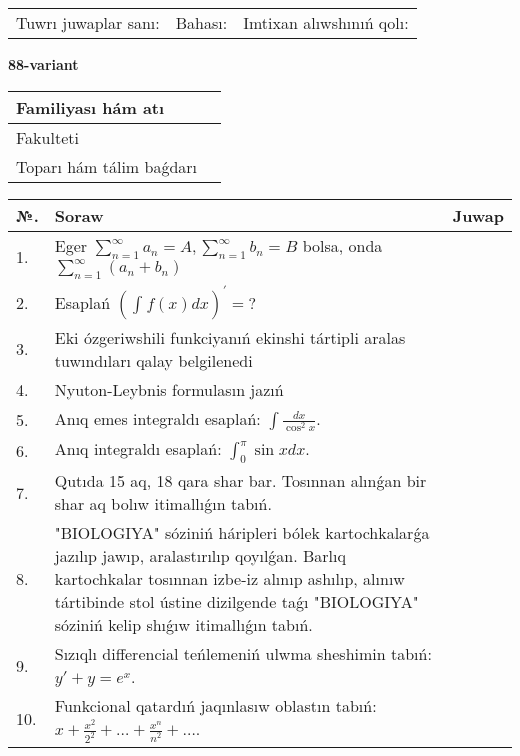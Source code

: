 \documentclass{article}
\begin{document}
\vspace{1cm}

\begin{tabular}{ c c c }
Tuwrı juwaplar sanı: \underline{\hspace{2cm}} & Bahası: \underline{\hspace{2cm}} & Imtixan alıwshınıń qolı: \underline{\hspace{2cm}} \\
\end{tabular}

\newpage

\begin{center}\textbf{88-variant}\end{center}

\bgroup
\def\arraystretch{1.5}
\begin{tabular}{ |m{6cm}|m{10cm}| }
  \hline
  Familiyası hám atı & \\
  \hline
  Fakulteti &\\
  \hline
  Toparı hám tálim baǵdarı & \\
  \hline
\end{tabular}
\egroup

\vspace{0.5cm}

\bgroup
\def\arraystretch{2}
\begin{tabular}{ |l|m{8cm}|m{7cm}| }
  \hline
  №. & Soraw & Juwap \\
  \hline
  1. & Eger $\displaystyle\sum_{n = 1}^{\infty}a_{n} = A, \sum_{n = 1}^{\infty}b_{n} = B$ bolsa, onda $\displaystyle\sum_{n = 1}^{\infty}\left( a_{n} + b_{n} \right)$ &  \\
  \hline
  2. & Esaplań $\displaystyle \left( \int_{}^{}{f(x)dx} \right)^\prime = ?$ &  \\
  \hline
  3. & Eki ózgeriwshili funkciyanıń ekinshi tártipli aralas tuwındıları qalay belgilenedi &  \\
  \hline
  4. & Nyuton-Leybnis formulasın jazıń &  \\
  \hline
  5. & Anıq emes integraldı esaplań: $\displaystyle\int \frac{dx}{\cos^{2}x}$. &  \\
  \hline
  6. & Anıq integraldı esaplań: $\displaystyle\int_{0}^{\pi}\sin xdx$. &  \\
  \hline
  7. & Qutıda 15 aq, 18 qara shar bar. Tosınnan alınǵan bir shar aq bolıw itimallıǵın tabıń. &  \\
  \hline
  8. & "BIOLOGIYA" sóziniń háripleri bólek kartochkalarǵa jazılıp jawıp, aralastırılıp qoyılǵan. Barlıq kartochkalar tosınnan izbe-iz alınıp ashılıp, alınıw tártibinde stol ústine dizilgende taǵı "BIOLOGIYA" sóziniń kelip shıǵıw itimallıǵın tabıń. &  \\
  \hline
  9. & Sızıqlı differencial teńlemeniń ulwma sheshimin tabıń: $y' + y =e^{x}$. &  \\
  \hline
  10. & Funkcional qatardıń jaqınlasıw oblastın tabıń: $\displaystyle x + \frac{x^{2}}{2^{2}} + \ldots + \frac{x^{n}}{n^{2}} + \ldots$. &  \\
  \hline
\end{tabular}
\egroup
\end{document}
